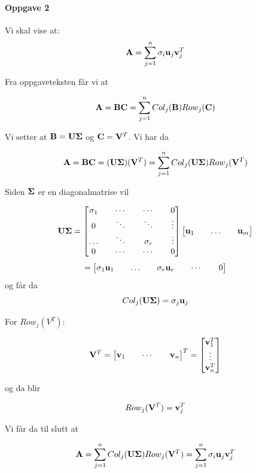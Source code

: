 \documentclass[a4paper,norsk, 10pt]{article}
\begin{document}
\paragraph*{Oppgave 2}

Vi skal vise at:
$$
\bold{A} = \sum_{j=1}^n \sigma_i \bold{u}_j \bold{v}_j^T
$$

Fra oppgaveteksten får vi at

$$
\bold{A} = \bold{BC} = \sum_{j=1}^n Col_j(\bold{B}) Row_j(\bold{C})
$$

Vi setter at $\bold{B} = \bold{U}\bold{\Sigma}$ og $\bold{C} = \bold{V}^T$. Vi har da

$$
\bold{A} = \bold{BC} = (\bold{U\Sigma})(\bold{V}^T) = \sum_{j=1}^n Col_j(\bold{U\Sigma}) Row_j(\bold{V}^T)
$$

Siden $\bold{\Sigma}$ er en diagonalmatrise vil 

$$
\bold{U\Sigma} =
\begin{bmatrix}
\sigma_1 && \cdots && \cdots && 0 \\
0 && \ddots && \ddots && \vdots \\
\ldots && \ddots && \sigma_r && \vdots \\
0 && \cdots && \cdots && 0
\end{bmatrix}
\begin{bmatrix}
\bold{u}_1 && \ldots && \bold{u}_m
\end{bmatrix}
$$
$$
=
\begin{bmatrix}
\sigma_1 \bold{u}_1 && \ldots && \sigma_r \bold{u}_r && \cdots && 0
\end{bmatrix}
$$
og får da
$$
Col_j(\bold{U\Sigma}) = \sigma_j \bold{u}_j 
$$

For $Row_j(V^T)$:

$$
\bold{V}^T = 
\begin{bmatrix}
\bold{v}_1 && \cdots && \bold{v}_n
\end{bmatrix}^T
=
\begin{bmatrix}
\bold{v}_1^T \\
\vdots \\
\bold{v}_n^T
\end{bmatrix}
$$

og da blir 

$$
Row_j(\bold{V}^T) = \bold{v}_j^T
$$

Vi får da til slutt at 

\begin{equation}
\bold{A} = \sum_{j=1}^n Col_j(\bold{U\Sigma}) Row_j(\bold{V}^T) = \sum_{j=1}^n \sigma_i \bold{u}_j \bold{v}_j^T
\end{equation}
\end{document}
